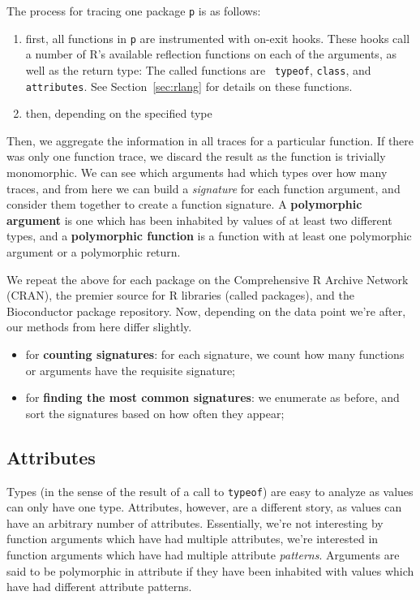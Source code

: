 \documentclass[acmsmall,10pt,review,anonymous]{acmart}\settopmatter{printfolios=true,printccs=false,printacmref=false}
\begin{document}
The process for tracing one package {\tt p} is as follows:

\begin{enumerate}
\item first, all functions in {\tt p} are instrumented with on-exit hooks.
  These hooks call a number of R's available reflection functions on each of
  the arguments, as well as the return type: The called functions are {\tt
    typeof}, {\tt class}, and {\tt attributes}.  See Section~\ref{sec:rlang}
  for details on these functions.
	
\item then, depending on the specified type 
\end{enumerate}

Then, we aggregate the information in all traces for a particular function.
If there was only one function trace, we discard the result as the function
is trivially monomorphic.  We can see which arguments had which types over
how many traces, and from here we can build a \textit{signature} for each
function argument, and consider them together to create a function
signature.  A \textbf{polymorphic argument} is one which has been inhabited
by values of at least two different types, and a \textbf{polymorphic
  function} is a function with at least one polymorphic argument or a
polymorphic return.

We repeat the above for each package on the Comprehensive R Archive Network
(CRAN), the premier source for R libraries (called packages), and the
Bioconductor package repository.  Now, depending on the data point we're
after, our methods from here differ slightly.

\begin{itemize}
    \item for \textbf{counting signatures}: for each signature, we count how
      many functions or arguments have the requisite signature;
    \item for \textbf{finding the most common signatures}: we enumerate as
      before, and sort the signatures based on how often they appear;
\end{itemize}

%
%
\subsection{Attributes}\label{sec:method:attributes}

Types (in the sense of the result of a call to {\tt typeof}) are easy to
analyze as values can only have one type.  Attributes, however, are a
different story, as values can have an arbitrary number of attributes.
Essentially, we're not interesting by function arguments which have had
multiple attributes, we're interested in function arguments which have had
multiple attribute \textit{patterns}. 
Arguments are said to be polymorphic in attribute if they have been
inhabited with values which have had different attribute patterns.  
\end{document}
